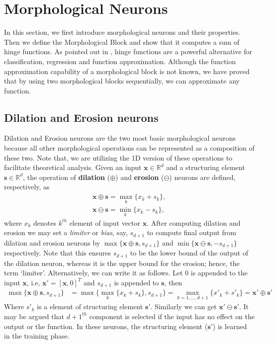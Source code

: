 \documentclass{bmvc2k}
\newcommand{\newterm}[1]{{\bf #1}}
\def\vs{{\bm{s}}}
\def\vx{{\bm{x}}}
\def\evs{{s}}
\def\evx{{x}}
\newcommand{\R}{\mathbb{R}}
\begin{document}
\section{Morphological Neurons}
\label{sec:morph_net}


In this section, we first introduce morphological neurons and their properties. Then we define the Morphological Block and show that it computes a sum of hinge functions. As pointed out in \cite{breiman1993hinging}, hinge functions are a powerful alternative for classification, regression and function approximation. Although the function approximation capability of a morphological block is not known, we have proved that by using two morphological blocks sequentially, we can approximate any function.

\subsection{Dilation and Erosion neurons}
\label{sec:de_neurons} 
Dilation and Erosion neurons are the two most basic morphological neurons because all other morphological operations can be represented as a composition of these two. Note that, we are utilizing the 1D version of these operations to facilitate theoretical analysis.
Given an input $\vx \in \R^d$ and a structuring element $\vs \in \R^{d}$, the operation of \newterm{dilation} ($\oplus$) and \newterm{erosion} ($\ominus$) neurons are defined, respectively, as 
\begin{align}
    \vx \oplus \vs  = \max_{k}\{\evx_k+\evs_k\}, \\
    \vx \ominus \vs  = \min_{k}\{\evx_k-\evs_k\},  \label{eq:dilationerosion}
\end{align}
where  $\evx_k$ denotes $k^{th}$ element of  input vector $\vx$. After computing dilation and erosion we may set a \textit{limiter} or \textit{bias}, say, $\evs_{d+1}$ to compute final output from dilation and erosion neurons by $\max\{ {\vx \oplus \vs }, \evs_{d+1} \}$ and $\min\{ {\vx \ominus \vs }, -\evs_{d+1} \}$ respectively. Note that this ensures $\evs_{d+1}$ to be the lower bound of the output of the dilation neuron, whereas it is the upper bound for the erosion; hence, the term `limiter'. 
Alternatively, we can write it as follows. Let 0 is appended to the input $\vx$, i.e, $\vx' = [\vx, 0]^T$ and  $\evs_{d+1}$ is appended to $\vs$, then
\begin{align}
     \max\{ {\vx \oplus \vs }, \evs_{d+1} \}&=\max\{\max_{k}\{\evx_k+\evs_k\},\evs_{d+1}\} =\max_{{k=1,\dots,d+1}}\{\evx'_k+\evs'_k\}
                    =\vx' \oplus \vs'       \label{eq:dilation_bias} 
\end{align}
Where $\evs'_k$ is a element of structuring element  $\vs'$. Similarly we can get $\vx' \ominus \vs'$. It may be argued that ${d+1}^{th}$ component is selected if the input has no effect on the output or the function. 
In these neurons, the structuring element ($\vs'$) is learned in the training phase.
\end{document}
